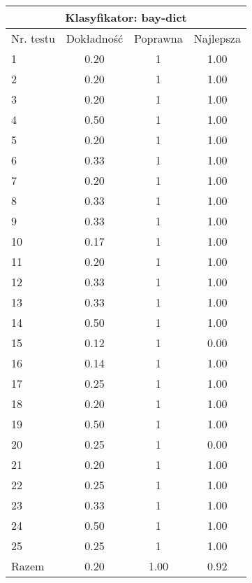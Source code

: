 \begin{tabular}{|l|c|c|c|}
\hline
\multicolumn{4}{|c|}{Klasyfikator: bay-dict}\\
\hline
Nr. testu & Dokładność & Poprawna & Najlepsza\\
\hline
1 & 0.20 & 1 & 1.00 \\
2 & 0.20 & 1 & 1.00 \\
3 & 0.20 & 1 & 1.00 \\
4 & 0.50 & 1 & 1.00 \\
5 & 0.20 & 1 & 1.00 \\
6 & 0.33 & 1 & 1.00 \\
7 & 0.20 & 1 & 1.00 \\
8 & 0.33 & 1 & 1.00 \\
9 & 0.33 & 1 & 1.00 \\
10 & 0.17 & 1 & 1.00 \\
11 & 0.20 & 1 & 1.00 \\
12 & 0.33 & 1 & 1.00 \\
13 & 0.33 & 1 & 1.00 \\
14 & 0.50 & 1 & 1.00 \\
15 & 0.12 & 1 & 0.00 \\
16 & 0.14 & 1 & 1.00 \\
17 & 0.25 & 1 & 1.00 \\
18 & 0.20 & 1 & 1.00 \\
19 & 0.50 & 1 & 1.00 \\
20 & 0.25 & 1 & 0.00 \\
21 & 0.20 & 1 & 1.00 \\
22 & 0.25 & 1 & 1.00 \\
23 & 0.33 & 1 & 1.00 \\
24 & 0.50 & 1 & 1.00 \\
25 & 0.25 & 1 & 1.00 \\
\hline
Razem & 0.20 & 1.00 & 0.92 \\
\hline
\end{tabular}
